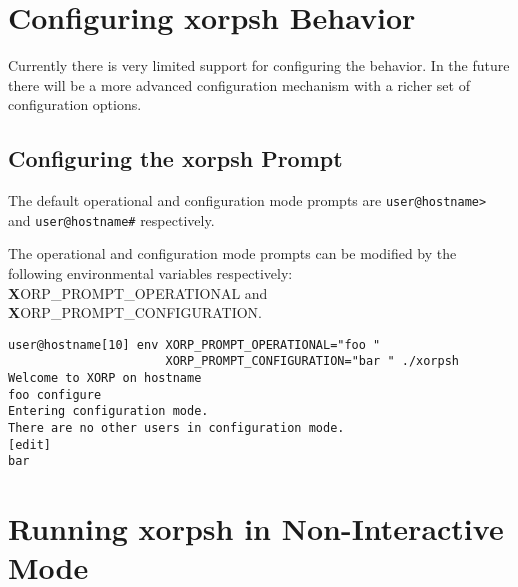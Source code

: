 \noindent{}
\vspace{0.1in}

\section{Configuring xorpsh Behavior}
\label{xorpsh:configuring-xorpsh-behavior}

Currently there is very limited support for configuring the \xorpsh
behavior. In the future there will be a more advanced configuration
mechanism with a richer set of configuration options.

\subsection{Configuring the xorpsh Prompt}

The default operational and configuration mode prompts are
\verb=user@hostname>= and \verb=user@hostname#= respectively.

The operational and configuration mode prompts can be modified by the
following environmental variables respectively:
{\textbf XORP\_PROMPT\_OPERATIONAL} and
{\textbf XORP\_PROMPT\_CONFIGURATION}.

\begin{verbatim}
user@hostname[10] env XORP_PROMPT_OPERATIONAL="foo " 
                      XORP_PROMPT_CONFIGURATION="bar " ./xorpsh
Welcome to XORP on hostname
foo configure
Entering configuration mode.
There are no other users in configuration mode.
[edit]
bar 
\end{verbatim}

\section{Running xorpsh in Non-Interactive Mode}
\label{xorpsh:non-interactive-mode}

